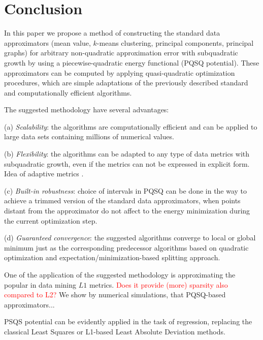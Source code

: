 \documentclass[preprint,12pt]{elsarticle}
\newcommand\myworries[1]{\textcolor{red}{#1}}
\begin{document}
\section{Conclusion}

In this paper we propose a method of constructing the standard data approximators (mean value, $k$-means clustering, principal components, principal graphs)
for arbitrary non-quadratic approximation error with subquadratic growth by using a piecewise-quadratic energy functional (PQSQ potential). These approximators can be computed
by applying quasi-quadratic optimization procedures, which are simple adaptations of the previously described standard and computationally efficient algorithms.

The suggested methodology have several advantages:

(a) \textit{Scalability}: the algorithms are computationally efficient and can be applied to large data sets containing millions of numerical values.

(b) \textit{Flexibility}: the algorithms can be adapted to any type of data metrics with subquadratic growth, even if the metrics can not be expressed in explicit form. Idea of adaptive metrics \cite{Yang2006, Wu2009}.

(c) \textit{Built-in robustness}: choice of intervals in PQSQ can be done in the way to achieve a trimmed version of the standard data approximators, when points distant from the approximator do not affect to the energy minimization during the current optimization step.

(d) \textit{Guaranteed convergence}: the suggested algorithms converge to local or global minimum just as the corresponding predecessor algorithms based on quadratic optimization and expectation/minimization-based splitting approach.

One of the application of the suggested methodology is approximating the popular in data mining $L1$ metrics. \myworries{ Does it provide (more) sparsity also compared to L2?} We show by numerical simulations, that PQSQ-based approximators...

PSQS potential can be evidently applied in the task of regression, replacing the classical Least Squares or L1-based Least Absolute Deviation methods.









\end{document}
